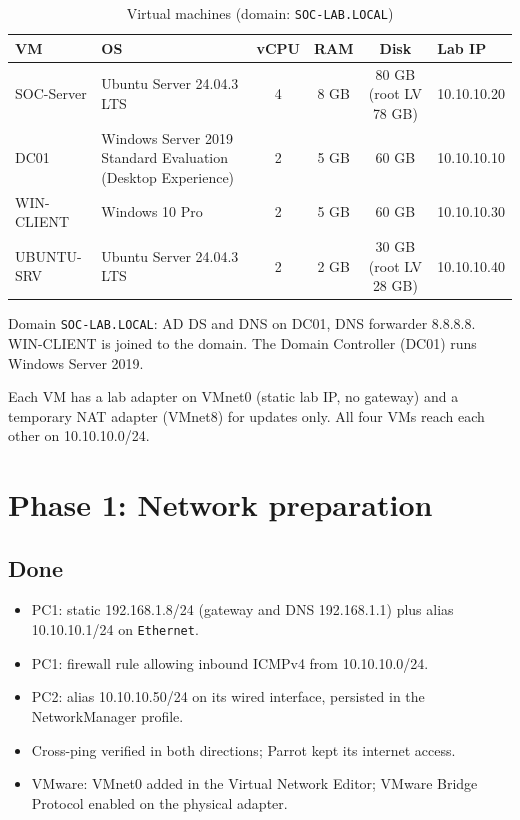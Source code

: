 \documentclass[11pt,a4paper]{article}
\begin{document}
\begin{table}[h]
\centering
\small
\begin{tabularx}{\textwidth}{lXcccl}
\toprule
VM & OS & vCPU & RAM & Disk & Lab IP \\
\midrule
SOC-Server & Ubuntu Server 24.04.3 LTS & 4 & 8 GB & 80 GB (root LV 78 GB) & 10.10.10.20 \\
DC01 & Windows Server 2019 Standard Evaluation (Desktop Experience) & 2 & 5 GB & 60 GB & 10.10.10.10 \\
WIN-CLIENT & Windows 10 Pro & 2 & 5 GB & 60 GB & 10.10.10.30 \\
UBUNTU-SRV & Ubuntu Server 24.04.3 LTS & 2 & 2 GB & 30 GB (root LV 28 GB) & 10.10.10.40 \\
\bottomrule
\end{tabularx}
\caption{Virtual machines (domain: \texttt{SOC-LAB.LOCAL})}
\end{table}

Domain \texttt{SOC-LAB.LOCAL}: AD DS and DNS on DC01, DNS forwarder 8.8.8.8.
WIN-CLIENT is joined to the domain. The Domain Controller (DC01) runs Windows
Server 2019.

Each VM has a lab adapter on VMnet0 (static lab IP, no gateway) and a
temporary NAT adapter (VMnet8) for updates only. All four VMs reach each other
on 10.10.10.0/24.

\section{Phase 1: Network preparation}

\subsection{Done}
\begin{itemize}
  \item PC1: static 192.168.1.8/24 (gateway and DNS 192.168.1.1) plus alias
        10.10.10.1/24 on \texttt{Ethernet}.
  \item PC1: firewall rule allowing inbound ICMPv4 from 10.10.10.0/24.
  \item PC2: alias 10.10.10.50/24 on its wired interface, persisted in the
        NetworkManager profile.
  \item Cross-ping verified in both directions; Parrot kept its internet access.
  \item VMware: VMnet0 added in the Virtual Network Editor; VMware Bridge
        Protocol enabled on the physical adapter.
\end{itemize}
\end{document}
